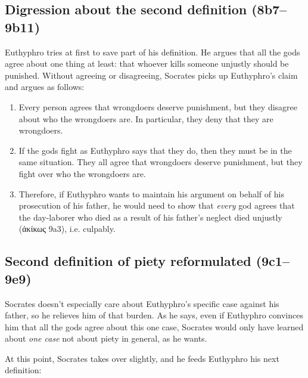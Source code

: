 \documentclass[11pt]{article}
\begin{document}

\subsection{Digression about the second definition (8b7--9b11)}

Euthyphro tries at first to save part of his definition.  He argues that
all the gods agree about one thing at least: that whoever kills someone
unjustly should be punished.  Without agreeing or disagreeing, Socrates
picks up Euthyphro's claim and argues as follows:

\begin{enumerate}

    \item Every person agrees that wrongdoers deserve punishment, but they
        disagree about who the wrongdoers are.  In particular, they deny
        that they are wrongdoers.

    \item If the gods fight as Euthyphro says that they do, then they must
        be in the same situation.  They all agree that wrongdoers deserve
        punishment, but they fight over who the wrongdoers are.

    \item Therefore, if Euthyphro wants to maintain his argument on behalf
        of his prosecution of his father, he would need to show that
        \emph{every} god agrees that the day-laborer who died as a result
        of his father's neglect died unjustly ({\g ἀκίκως} 9a3), i.e.
        culpably.

\end{enumerate}


\subsection{Second definition of piety reformulated (9c1--9e9)}

Socrates doesn't especially care about Euthyphro's specific case against
his father, so he relieves him of that burden.  As he says, even if
Euthyphro convinces him that all the gods agree about this one case,
Socrates would only have learned about \emph{one case} not about piety in
general, as he wants.

At this point, Socrates takes over slightly, and he feeds Euthyphro his
next definition:
\end{document}
